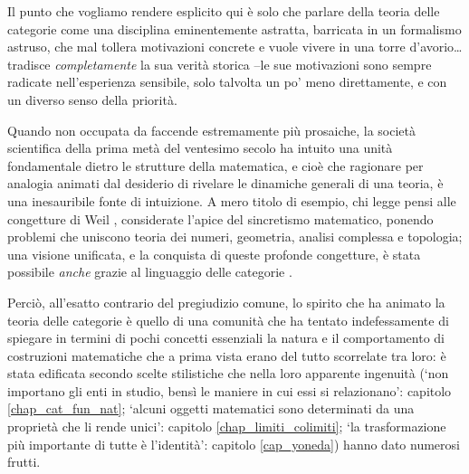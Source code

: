 Il punto che vogliamo rendere esplicito qui è solo che parlare della teoria delle categorie come una disciplina eminentemente astratta, barricata in un formalismo astruso, che mal tollera motivazioni concrete e vuole vivere in una torre d'avorio\dots{} tradisce \emph{completamente} la sua verità storica --le sue motivazioni sono sempre radicate nell'esperienza sensibile, solo talvolta un po' meno direttamente, e con un diverso senso della priorità.

Quando non occupata da faccende estremamente più prosaiche, la società scientifica della prima metà del ventesimo secolo ha intuito una unità fondamentale dietro le strutture della matematica, e cioè che ragionare per analogia animati dal desiderio di rivelare le dinamiche generali di una teoria, è una inesauribile fonte di intuizione. A mero titolo di esempio, chi legge pensi alle congetture di Weil \cite{PMIHES_1974__43__273_0,PMIHES_1980__52__137_0}, considerate l'apice del sincretismo matematico, ponendo problemi che uniscono teoria dei numeri, geometria, analisi complessa e topologia; una visione unificata, e la conquista di queste profonde congetture, è stata possibile \emph{anche} grazie al linguaggio delle categorie \cite{something_about_grothendieck}.

Perciò, all'esatto contrario del pregiudizio comune, lo spirito che ha animato la teoria delle categorie è quello di una comunità che ha tentato indefessamente di spiegare in termini di pochi concetti essenziali la natura e il comportamento di costruzioni matematiche che a prima vista erano del tutto scorrelate tra loro: è stata edificata secondo scelte stilistiche che nella loro apparente ingenuità (`non importano gli enti in studio, bensì le maniere in cui essi si relazionano': capitolo \ref{chap_cat_fun_nat}; `alcuni oggetti matematici sono determinati da una proprietà che li rende unici': capitolo \ref{chap_limiti_colimiti}; `la trasformazione più importante di tutte è l'identità': capitolo \ref{cap_yoneda}) hanno dato numerosi frutti.

